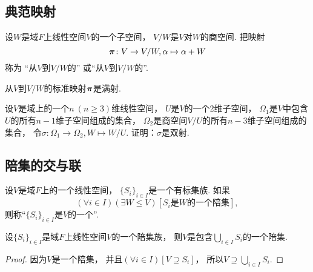 \subsection{典范映射}
\begin{definition}
设\(W\)是域\(F\)上线性空间\(V\)的一个子空间，
\(V/W\)是\(V\)对\(W\)的商空间.
把映射\begin{equation*}
	\boldsymbol\pi\colon V \to V/W,
	\alpha \mapsto \alpha+W
\end{equation*}称为
“从\(V\)到\(V/W\)的”
或“从\(V\)到\(V/W\)的”.
\end{definition}

\begin{proposition}
从\(V\)到\(V/W\)的标准映射\(\boldsymbol\pi\)是满射.
\end{proposition}

\begin{example}
设\(V\)是域上的一个\(n\ (n\geq3)\)维线性空间，
\(U\)是\(V\)的一个2维子空间，
\(\Omega_1\)是\(V\)中包含\(U\)的所有\(n-1\)维子空间组成的集合，
\(\Omega_2\)是商空间\(V/U\)的所有\(n-3\)维子空间组成的集合，
令\(\sigma\colon \Omega_1 \to \Omega_2, W \mapsto W/U\).
证明：\(\sigma\)是双射.
\end{example}

\subsection{陪集的交与联}
设\(V\)是域\(F\)上的一个线性空间，
\(\{S_i\}_{i \in I}\)是一个有标集族.
如果\begin{equation*}
	(\forall i \in I)
	(\exists W \leq V)
	[
		\text{$S_i$是$W$的一个陪集}
	],
\end{equation*}
则称“\(\{S_i\}_{i \in I}\)是\(V\)的一个”.

\begin{proposition}
设\(\{S_i\}_{i \in I}\)是域\(F\)上线性空间\(V\)的一个陪集族，
则\(V\)是包含\(\bigcup_{i \in I} S_i\)的一个陪集.
\begin{proof}
因为\(V\)是一个陪集，
并且\((\forall i \in I)[V \supseteq S_i]\)，
所以\(V \supseteq \bigcup_{i \in I} S_i\).
\end{proof}
\end{proposition}

